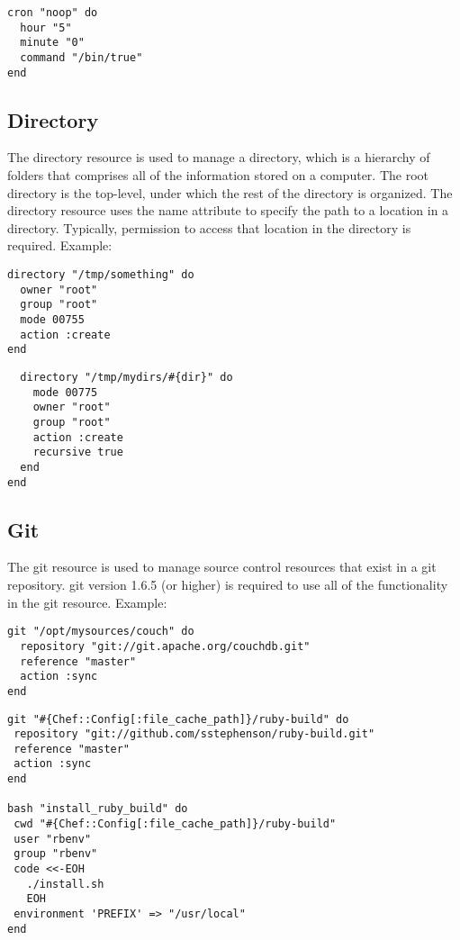 \begin{lstlisting}[label=lst:cookbook-resources-cron2]
cron "noop" do
  hour "5"
  minute "0"
  command "/bin/true"
end
\end{lstlisting}

\subsection{Directory}

The directory resource is used to manage a directory, which is a hierarchy of folders that comprises all of the information stored on a computer. The root directory is the top-level, under which the rest of the directory is organized. The directory resource uses the name attribute to specify the path to a location in a directory. Typically, permission to access that location in the directory is required. Example:

\begin{lstlisting}[label=lst:cookbook-resources-directory1]
directory "/tmp/something" do
  owner "root"
  group "root"
  mode 00755
  action :create
end
\end{lstlisting}

\begin{lstlisting}[label=lst:cookbook-resources-directory2]
%w{dir1 dir2 dir3}.each do |dir|
  directory "/tmp/mydirs/#{dir}" do
    mode 00775
    owner "root"
    group "root"
    action :create
    recursive true
  end
end
\end{lstlisting}

\subsection{Git}

The git resource is used to manage source control resources that exist in a git repository. git version 1.6.5 (or higher) is required to use all of the functionality in the git resource. Example:

\begin{lstlisting}[label=lst:cookbook-resources-git1]
git "/opt/mysources/couch" do
  repository "git://git.apache.org/couchdb.git"
  reference "master"
  action :sync
end
\end{lstlisting}

\begin{lstlisting}[label=lst:cookbook-resources-git2]
git "#{Chef::Config[:file_cache_path]}/ruby-build" do
 repository "git://github.com/sstephenson/ruby-build.git"
 reference "master"
 action :sync
end

bash "install_ruby_build" do
 cwd "#{Chef::Config[:file_cache_path]}/ruby-build"
 user "rbenv"
 group "rbenv"
 code <<-EOH
   ./install.sh
   EOH
 environment 'PREFIX' => "/usr/local"
end
\end{lstlisting}

